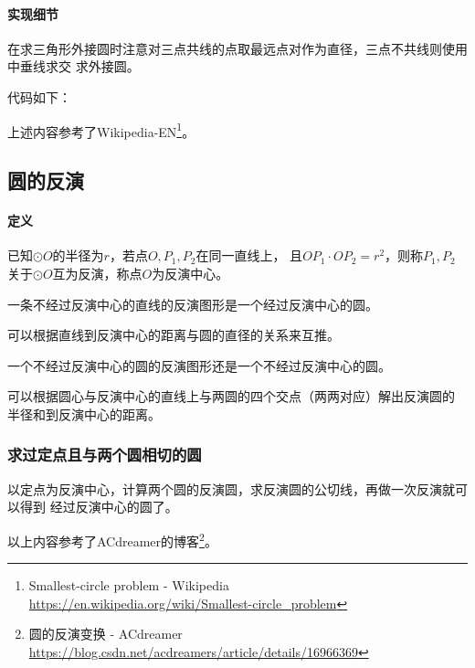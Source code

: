 \paragraph{实现细节}
在求三角形外接圆时注意对三点共线的点取最远点对作为直径，三点不共线则使用中垂线求交
求外接圆。

代码如下：


上述内容参考了Wikipedia-EN\footnote{
	Smallest-circle problem - Wikipedia\\
	\url{https://en.wikipedia.org/wiki/Smallest-circle\_problem}
}。
\subsection{圆的反演}
\paragraph{定义} 已知$\odot O$的半径为$r$，若点$O,P_1,P_2$在同一直线上，
且$OP_1\cdot OP_2=r^2$，则称$P_1,P_2$关于$\odot O$互为反演，称点$O$为反演中心。

\begin{property}
	一条不经过反演中心的直线的反演图形是一个经过反演中心的圆。
\end{property}
可以根据直线到反演中心的距离与圆的直径的关系来互推。

\begin{property}
	一个不经过反演中心的圆的反演图形还是一个不经过反演中心的圆。
\end{property}
可以根据圆心与反演中心的直线上与两圆的四个交点（两两对应）解出反演圆的
半径和到反演中心的距离。

\subsubsection{求过定点且与两个圆相切的圆}
以定点为反演中心，计算两个圆的反演圆，求反演圆的公切线，再做一次反演就可以得到
经过反演中心的圆了。

以上内容参考了ACdreamer的博客\footnote{
	圆的反演变换 - ACdreamer
	\url{https://blog.csdn.net/acdreamers/article/details/16966369}
}。
